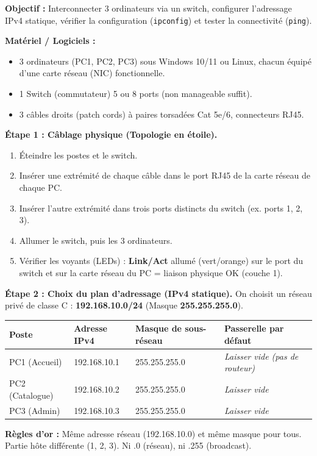 \documentclass[11pt]{article}
\begin{document}
\begin{experience}
\textbf{Objectif :} Interconnecter 3 ordinateurs via un switch, configurer l'adressage IPv4 statique, vérifier la configuration (\texttt{ipconfig}) et tester la connectivité (\texttt{ping}).

\textbf{Matériel / Logiciels :}
\begin{itemize}
\item 3 ordinateurs (PC1, PC2, PC3) sous Windows 10/11 ou Linux, chacun équipé d'une carte réseau (NIC) fonctionnelle.
\item 1 Switch (commutateur) 5 ou 8 ports (non manageable suffit).
\item 3 câbles droits (patch cords) à paires torsadées Cat 5e/6, connecteurs RJ45.
\end{itemize}

\textbf{Étape 1 : Câblage physique (Topologie en étoile).}
\begin{enumerate}
\item Éteindre les postes et le switch.
\item Insérer une extrémité de chaque câble dans le port RJ45 de la carte réseau de chaque PC.
\item Insérer l'autre extrémité dans trois ports distincts du switch (ex. ports 1, 2, 3).
\item Allumer le switch, puis les 3 ordinateurs.
\item Vérifier les voyants (LEDs) : \textbf{Link/Act} allumé (vert/orange) sur le port du switch et sur la carte réseau du PC = liaison physique OK (couche 1).
\end{enumerate}

\textbf{Étape 2 : Choix du plan d'adressage (IPv4 statique).}
On choisit un réseau privé de classe C : \textbf{192.168.10.0/24} (Masque \textbf{255.255.255.0}).
\begin{center}
\begin{tabularx}{\linewidth}{|l|X|X|X|}
\hline
\rowcolor{popblueL} \textbf{Poste} & \textbf{Adresse IPv4} & \textbf{Masque de sous-réseau} & \textbf{Passerelle par défaut} \\
\hline
PC1 (Accueil) & 192.168.10.1 & 255.255.255.0 & \textit{Laisser vide (pas de routeur)} \\
\hline
PC2 (Catalogue) & 192.168.10.2 & 255.255.255.0 & \textit{Laisser vide} \\
\hline
PC3 (Admin) & 192.168.10.3 & 255.255.255.0 & \textit{Laisser vide} \\
\hline
\end{tabularx}
\end{center}
\textbf{Règles d'or :} Même adresse réseau (192.168.10.0) et même masque pour tous. Partie hôte différente (1, 2, 3). Ni .0 (réseau), ni .255 (broadcast).


\end{experience}
\end{document}
